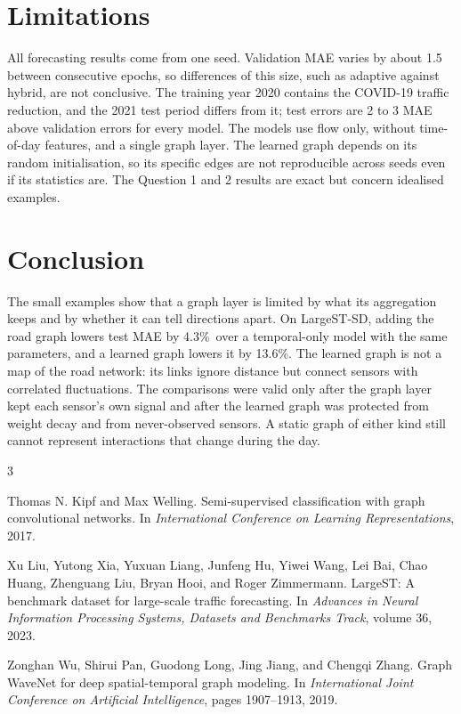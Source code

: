 \documentclass{article}
\newcommand{\pct}{\%\ }
\begin{document}
\section{Limitations}

All forecasting results come from one seed. Validation MAE varies by about 1.5 between consecutive epochs, so differences of this size, such as adaptive against hybrid, are not conclusive. The training year 2020 contains the COVID-19 traffic reduction, and the 2021 test period differs from it; test errors are 2 to 3 MAE above validation errors for every model. The models use flow only, without time-of-day features, and a single graph layer. The learned graph depends on its random initialisation, so its specific edges are not reproducible across seeds even if its statistics are. The Question 1 and 2 results are exact but concern idealised examples.

\section{Conclusion}

The small examples show that a graph layer is limited by what its aggregation keeps and by whether it can tell directions apart. On LargeST-SD, adding the road graph lowers test MAE by 4.3\pct over a temporal-only model with the same parameters, and a learned graph lowers it by 13.6\%. The learned graph is not a map of the road network: its links ignore distance but connect sensors with correlated fluctuations. The comparisons were valid only after the graph layer kept each sensor's own signal and after the learned graph was protected from weight decay and from never-observed sensors. A static graph of either kind still cannot represent interactions that change during the day.

\begin{thebibliography}{3}

Thomas N. Kipf and Max Welling.
\newblock Semi-supervised classification with graph convolutional networks.
\newblock In \emph{International Conference on Learning Representations}, 2017.

Xu Liu, Yutong Xia, Yuxuan Liang, Junfeng Hu, Yiwei Wang, Lei Bai, Chao Huang, Zhenguang Liu, Bryan Hooi, and Roger Zimmermann.
\newblock LargeST: A benchmark dataset for large-scale traffic forecasting.
\newblock In \emph{Advances in Neural Information Processing Systems, Datasets and Benchmarks Track}, volume 36, 2023.

Zonghan Wu, Shirui Pan, Guodong Long, Jing Jiang, and Chengqi Zhang.
\newblock Graph WaveNet for deep spatial-temporal graph modeling.
\newblock In \emph{International Joint Conference on Artificial Intelligence}, pages 1907--1913, 2019.

\end{thebibliography}
\end{document}
